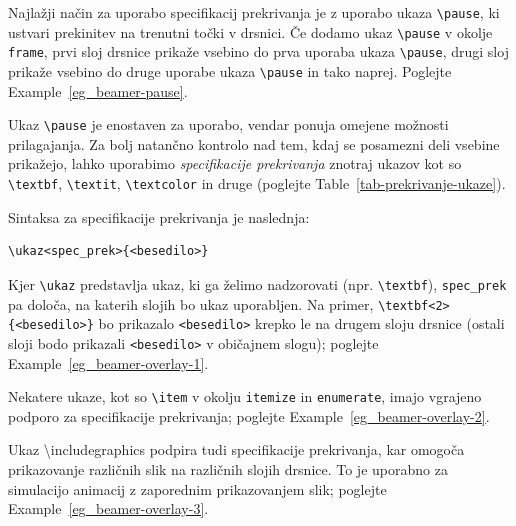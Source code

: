 Najlažji način za uporabo specifikacij prekrivanja je z uporabo ukaza \texttt{{\textbackslash}pause}, ki ustvari prekinitev na trenutni točki v drsnici.
Če dodamo ukaz \texttt{{\textbackslash}pause} v okolje \texttt{frame}, prvi sloj drsnice prikaže vsebino do prva uporaba ukaza \texttt{{\textbackslash}pause}, drugi sloj prikaže vsebino do druge uporabe ukaza \texttt{{\textbackslash}pause} in tako naprej. Poglejte Example~\ref{eg_beamer-pause}.

\begin{example}\label{eg_beamer-pause}\end{example}Ukaz \texttt{{\textbackslash}pause} je enostaven za uporabo, vendar ponuja omejene možnosti prilagajanja. Za bolj natančno kontrolo nad tem, kdaj se posamezni deli vsebine prikažejo, lahko uporabimo \textit{specifikacije prekrivanja} znotraj ukazov kot so \texttt{{\textbackslash}textbf}, \texttt{{\textbackslash}textit}, \texttt{{\textbackslash}textcolor} in druge (poglejte Table~\ref{tab-prekrivanje-ukaze}).

Sintaksa za specifikacije prekrivanja je naslednja:

\begin{verbatim}
\ukaz<spec_prek>{<besedilo>}
\end{verbatim}

Kjer \texttt{{\textbackslash}ukaz} predstavlja ukaz, ki ga želimo nadzorovati (npr. \texttt{{\textbackslash}textbf}), \texttt{spec\_prek} pa določa, na katerih slojih bo ukaz uporabljen. Na primer, \texttt{{\textbackslash}textbf\textless 2\textgreater \{\textless besedilo\textgreater \}} bo prikazalo \texttt{\textless besedilo\textgreater } krepko le na drugem sloju drsnice (ostali sloji bodo prikazali \texttt{\textless besedilo\textgreater } v običajnem slogu); poglejte Example~\ref{eg_beamer-overlay-1}.

\begin{example}\label{eg_beamer-overlay-1}\end{example}Nekatere ukaze, kot so \texttt{{\textbackslash}item} v okolju \texttt{itemize} in \texttt{enumerate}, imajo vgrajeno podporo za specifikacije prekrivanja; poglejte Example~\ref{eg_beamer-overlay-2}.

\begin{example}\label{eg_beamer-overlay-2}\end{example}Ukaz {\textbackslash}includegraphics podpira tudi specifikacije prekrivanja, kar omogoča prikazovanje različnih slik na različnih slojih drsnice. To je uporabno za simulacijo animacij z zaporednim prikazovanjem slik;
poglejte Example~\ref{eg_beamer-overlay-3}.

